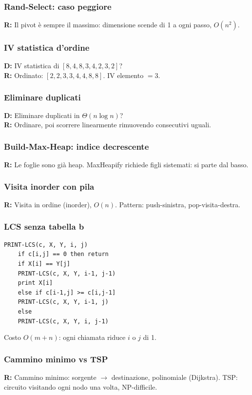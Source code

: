 \subsubsection*{Rand-Select: caso peggiore}
\textbf{R:} Il pivot è sempre il massimo: dimensione scende di 1 a ogni
passo, $O(n^2)$.

\subsubsection*{\texorpdfstring{IV statistica d'ordine}{IV statistica d'ordine}}
\textbf{D:} IV statistica di $[8,4,8,3,4,2,3,2]$?\\
\textbf{R:} Ordinato: $[2,2,3,3,4,4,8,8]$. IV elemento $= 3$.

\subsubsection*{Eliminare duplicati}
\textbf{D:} Eliminare duplicati in $\Theta(n\log n)$?\\
\textbf{R:} Ordinare, poi scorrere linearmente rimuovendo consecutivi uguali.

\subsubsection*{Build-Max-Heap: indice decrescente}
\textbf{R:} Le foglie sono già heap. MaxHeapify richiede figli sistemati:
si parte dal basso.

\subsubsection*{Visita inorder con pila}
\textbf{R:} Visita in ordine (inorder), $O(n)$.
Pattern: push-sinistra, pop-visita-destra.

\subsubsection*{LCS senza tabella b}
\begin{lstlisting}[language={}, numbers=none, frame=none,
	backgroundcolor=\color{white}, basicstyle=\ttfamily\footnotesize]
	PRINT-LCS(c, X, Y, i, j)
	if c[i,j] == 0 then return
	if X[i] == Y[j]
	PRINT-LCS(c, X, Y, i-1, j-1)
	print X[i]
	else if c[i-1,j] >= c[i,j-1]
	PRINT-LCS(c, X, Y, i-1, j)
	else
	PRINT-LCS(c, X, Y, i, j-1)
\end{lstlisting}
Costo $O(m+n)$: ogni chiamata riduce $i$ o $j$ di 1.

\subsubsection*{Cammino minimo vs TSP}
\textbf{R:} Cammino minimo: sorgente $\to$ destinazione, polinomiale
(Dijkstra). TSP: circuito visitando ogni nodo una volta, NP-difficile.

